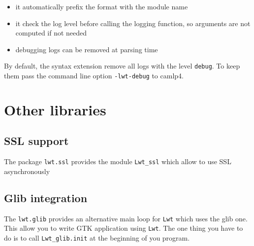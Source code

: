 \documentclass{article}
\newcommand{\lwt}{\texttt{Lwt}\xspace}
\begin{document}
\begin{itemize}
\item it automatically prefix the format with the module name
\item it check the log level before calling the logging function, so
  arguments are not computed if not needed
\item debugging logs can be removed at parsing time
\end{itemize}

By default, the syntax extension remove all logs with the level
\texttt{debug}. To keep them pass the command line option
\texttt{-lwt-debug} to camlp4.

\section{Other libraries}

\subsection{SSL support}

The package \texttt{lwt.ssl} provides the module \texttt{Lwt\_ssl}
which allow to use SSL asynchronously

\subsection{Glib integration}

The \texttt{lwt.glib} provides an alternative main loop for \lwt which
uses the glib one. This allow you to write GTK application using \lwt.
The one thing you have to do is to call \texttt{Lwt\_glib.init} at the
beginning of you program.
\end{document}
